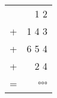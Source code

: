 \documentclass{article}
\begin{document}
\begin{tabular}{lr}
&1 2\\
+&1 4 3\\
+&6 5 4\\
+&2 4\\
\hline
=&$\square \square \square$
\end{tabular}
\end{document}
